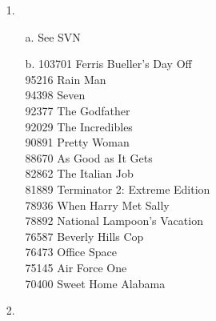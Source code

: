 \documentclass{article}
\begin{document}
\begin{itemize}
\item[1.] 
	\begin{itemize}
		\item[a.] See SVN
		\item[b.] 
		103701	Ferris Bueller's Day Off\\
		95216	Rain Man\\
		94398	Seven\\
		92377	The Godfather\\
		92029	The Incredibles\\
		90891	Pretty Woman\\
		88670	As Good as It Gets\\
		82862	The Italian Job\\
		81889	Terminator 2: Extreme Edition\\
		78936	When Harry Met Sally\\
		78892	National Lampoon's Vacation\\
		76587	Beverly Hills Cop\\
		76473	Office Space\\
		75145	Air Force One\\
		70400	Sweet Home Alabama
	\end{itemize}

\pagebreak
\item[2.]

	
\end{itemize}
\end{document}

